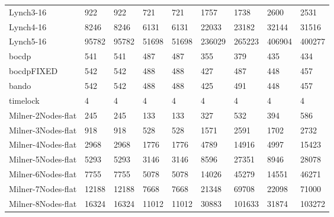 \begin{table}
\begin{adjustbox}{max totalheight=\textheight}
\begin{tabular}{|l|llllllll|}
    Lynch3-16          & 922               & 922               & 721               & 721               & 1757     & 1738     & 2600     & 2531     \\
    Lynch4-16          & 8246              & 8246              & 6131              & 6131              & 22033    & 23182    & 32144    & 31516    \\
    Lynch5-16          & 95782             & 95782             & 51698             & 51698             & 236029   & 265223   & 406904   & 400277   \\ \hline
    bocdp              & 541               & 541               & 487               & 487               & 355      & 379      & 435      & 434      \\
    bocdpFIXED         & 542               & 542               & 488               & 488               & 427      & 487      & 448      & 457      \\
    bando              & 542               & 542               & 488               & 488               & 425      & 491      & 448      & 457      \\
    timelock           & 4                 & 4                 & 4                 & 4                 & 4        & 4        & 4        & 4        \\ \hline
    Milner-2Nodes-flat & 245               & 245               & 133               & 133               & 327      & 532      & 394      & 586      \\
    Milner-3Nodes-flat & 918               & 918               & 528               & 528               & 1571     & 2591     & 1702     & 2732     \\
    Milner-4Nodes-flat & 2968              & 2968              & 1776              & 1776              & 4789     & 14916    & 4997     & 15423    \\
    Milner-5Nodes-flat & 5293              & 5293              & 3146              & 3146              & 8596     & 27351    & 8946     & 28078    \\
    Milner-6Nodes-flat & 7755              & 7755              & 5078              & 5078              & 14026    & 45279    & 14551    & 46271    \\
    Milner-7Nodes-flat & 12188             & 12188             & 7668              & 7668              & 21348    & 69708    & 22098    & 71000    \\
    Milner-8Nodes-flat & 16324             & 16324             & 11012             & 11012             & 30883    & 101633   & 31874    & 103272   \\ \hline

\end{tabular}
\end{adjustbox}
\end{table}
